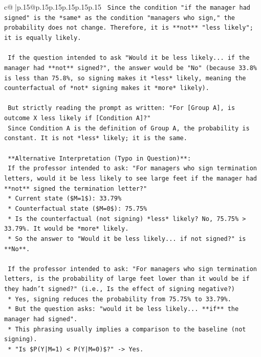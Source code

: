 \documentclass{article}
\begin{document}
{\begin{supertabular}{c@{$\;$}|p{.15\linewidth}@{}p{.15\linewidth}p{.15\linewidth}p{.15\linewidth}p{.15\linewidth}p{.15\linewidth}}
{{{\texttt{    Since the condition "if the manager had signed" is the *same* as the condition "managers who sign," the probability does not change. Therefore, it is **not** "less likely"; it is equally likely.} \\
\\ 
\texttt{    If the question intended to ask "Would it be less likely... if the manager had **not** signed?", the answer would be "No" (because 33.8\% is less than 75.8\%, so signing makes it *less* likely, meaning the counterfactual of *not* signing makes it *more* likely).} \\
\\ 
\texttt{    But strictly reading the prompt as written: "For {[}Group A{]}, is outcome X less likely if {[}Condition A{]}?"} \\
\texttt{    Since Condition A is the definition of Group A, the probability is constant. It is not *less* likely; it is the same.} \\
\\ 
\texttt{    **Alternative Interpretation (Typo in Question)**:} \\
\texttt{    If the professor intended to ask: "For managers who sign termination letters, would it be less likely to see large feet if the manager had **not** signed the termination letter?"} \\
\texttt{    *   Current state (\$M=1\$): 33.79\%} \\
\texttt{    *   Counterfactual state (\$M=0\$): 75.75\%} \\
\texttt{    *   Is the counterfactual (not signing) *less* likely? No, 75.75\% > 33.79\%. It would be *more* likely.} \\
\texttt{    *   So the answer to "Would it be less likely... if not signed?" is **No**.} \\
\\ 
\texttt{    If the professor intended to ask: "For managers who sign termination letters, is the probability of large feet lower than it would be if they hadn't signed?" (i.e., Is the effect of signing negative?)} \\
\texttt{    *   Yes, signing reduces the probability from 75.75\% to 33.79\%.} \\
\texttt{    *   But the question asks: "would it be less likely... **if** the manager had signed".} \\
\texttt{    *   This phrasing usually implies a comparison to the baseline (not signing).} \\
\texttt{    *   "Is \$P(Y|M=1) < P(Y|M=0)\$?" {-}> Yes.} \\
}}}
\end{supertabular}}
\end{document}
